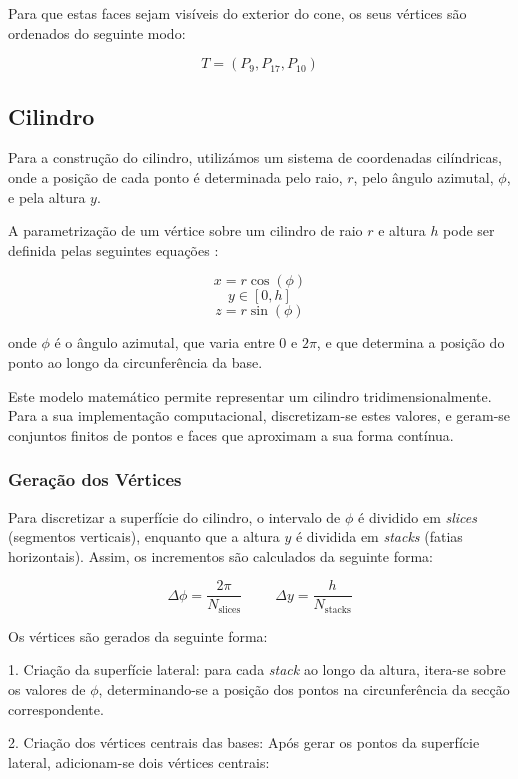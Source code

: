 \documentclass[12pt, a4paper]{article}
\begin{document}
Para que estas faces sejam visíveis do exterior do cone, os seus vértices são ordenados do seguinte
modo:

$$
T = (P_9, P_{17}, P_{10})
$$

\subsection{Cilindro}

Para a construção do cilindro, utilizámos um sistema de coordenadas cilíndricas, onde a posição de
cada ponto é determinada pelo raio, $r$, pelo ângulo azimutal, $\phi$, e pela altura $y$.

A parametrização de um vértice sobre um cilindro de raio $r$ e altura $h$ pode ser definida pelas
seguintes equações \cite{cylinder}:

$$x = r \cos(\phi)$$
$$y \in \left [ 0, h \right ]$$
$$z = r \sin(\phi)$$

onde $\phi$ é o ângulo azimutal, que varia entre $0$ e $2\pi$, e que determina a posição do ponto ao
longo da circunferência da base.

Este modelo matemático permite representar um cilindro tridimensionalmente. Para a sua implementação
computacional, discretizam-se estes valores, e geram-se conjuntos finitos de pontos e faces que
aproximam a sua forma contínua.

\subsubsection{Geração dos Vértices}

Para discretizar a superfície do cilindro, o intervalo de $\phi$ é dividido em \emph{slices}
(segmentos verticais), enquanto que a altura $y$ é dividida em \emph{stacks} (fatias horizontais).
Assim, os incrementos são calculados da seguinte forma:

$$
\Delta \phi = \frac{2\pi}{N_\text{slices}}
\hspace{1cm}
\Delta y = \frac{h}{N_\text{stacks}}
$$

Os vértices são gerados da seguinte forma:

1. Criação da superfície lateral: para cada \emph{stack} ao longo da altura, itera-se sobre os
valores de $\phi$, determinando-se a posição dos pontos na circunferência da secção correspondente.

2. Criação dos vértices centrais das bases: Após gerar os pontos da superfície lateral, adicionam-se
dois vértices centrais:
\end{document}
